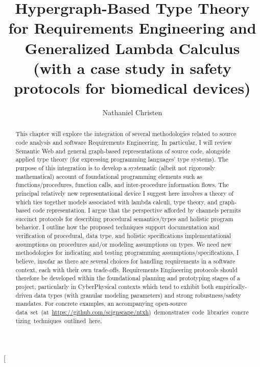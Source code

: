 \documentclass[11pt,twocolumn]{article}
\begin{document}
\title{Hypergraph-Based Type Theory for Requirements Engineering and
Generalized Lambda Calculus (with a case study in safety protocols 
for biomedical devices)}
\author{Nathaniel Christen}
\twocolumn[\begin{@twocolumnfalse}
\maketitle{}
\begin{abstract}This chapter will explore the integration of several methodologies 
related to source code analysis and software Requirements 
Engineering.  In particular, I will review Semantic Web 
and general graph-based representations of source code, 
alongside applied type theory (for expressing 
programming languages' type systems).  The purpose of this 
integration is to develop a systematic (albeit not 
rigorously mathematical) account of foundational programming 
elements such as functions/procedures, function calls, and 
inter-procedure information flows.  The principal relatively new 
representational device I suggest here involves a theory 
of  which ties together models associated with 
lambda calculi, type theory, and graph-based code representation.  
I argue that the perspective afforded by channels permits 
succinct protocols for describing procedural 
semantics/types and holistic program behavior.  I 
outline how the proposed techniques support documentation and 
verification of procedural, data type, and holistic 
specifications \mdash{} implementational assumptions on procedures  
and/or modeling assumptions on types.   
We need new methodologies for indicating and testing 
programming assumptions/specifications, I believe, insofar as 
there are several choices for handling requirements in 
a software context, each with their own trade-offs.  
Requirements Engineering protocols should therefore 
be developed within the foundational planning and 
prototyping stages of a project, particularly
in CyberPhysical contexts which tend to exhibit both 
empirically-driven data types (with granular 
modeling parameters) and strong robustness/safety mandates.
For concrete examples, an accompanying open-source \mbox{data set (at
\url{https://github.com/scignscape/ntxh}) 
demonstrates code libraries concretizing 
techniques outlined here.}
\end{abstract} 
\newsavebox{\qboxii}

\end{@twocolumnfalse}
\end{document}
